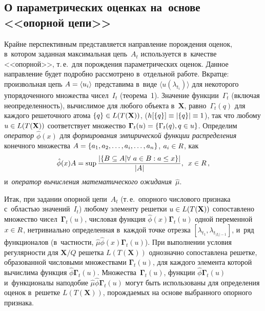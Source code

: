 \begin{multicols}{2}
\section{О параметрических оценках на~основе <<опорной цепи>>}

     Крайне перспективным пред\-став\-ля\-ет\-ся на\-прав\-ле\-ние по\-рож\-де\-ния 
оценок, в~котором заданная максимальная цепь~$A_t$ используется 
в~качестве <<опор\-ной>>, т.\,е.\ для по\-рож\-де\-ния па\-ра\-мет\-ри\-че\-ских \mbox{оценок}. 
Данное на\-прав\-ле\-ние будет по\-дроб\-но рас\-смот\-ре\-но в~отдельной работе. 
Вкратце: произвольная цепь $A\hm= \langle u_i\rangle$ пред\-ста\-ви\-ма в~виде 
$\langle u(\lambda_{t_i})\rangle$ для некоторого упорядоченного множества 
чисел~$I_t$ (тео\-ре\-ма~1). Значение функции~$\Gamma_t$ (включая 
не\-опре\-де\-лен\-ность), вы\-чис\-ли\-мое для любого объекта в~$\mathbf{X}$, 
рав\-но~$\Gamma_t(q)$ для каж\-до\-го решеточного атома $\{q\}\hm\in 
L(T(\mathbf{X}))$, ($h[\{q\}] \hm\equiv \vert \{q\}\vert \hm\equiv 1$), так что 
любому $u\hm\in L(T(\mathbf{X}))$ соответствует множество 
$\bm{\Gamma}_t (u)\hm= \{ \Gamma_t(q), q\hm\in u\}$. Определим 
\textit{оператор} $\hat{\phi}(x)$ для \textit{формирования эмпирической 
функции распределения}  конечного множества $A\hm= \{a_1, a_2, \ldots , a_i, 
\ldots , a_n\}$, $a_i\hm\in R$, как 
$$
\hat{\phi}(x) A=\mathrm{sup}\,\fr{\vert \{ 
B\hm\subseteq A\vert \forall\ a\in B: a\hm\leq x\}\vert }{\vert A\vert},\enskip x\in R\,,
$$
 и~\textit{оператор вы\-чис\-ле\-ния математического ожидания}~$\hat{\mu}$. 
     
     Итак, при задании опорной цепи~$A_t$ (т.\,е.\ опорного чис\-ло\-во\-го 
при\-зна\-ка с~об\-ластью значений~$I_t$) любому элементу решетки $u\hm\in 
L(T(\mathbf{X}))$ со\-по\-став\-ле\-но множество чисел~$\bm{\Gamma}_t(u)$, 
числовая функция $\hat{\phi}(x)\bm{\Gamma}_t(u)$ одной переменной 
$x\hm\in R$, не\-три\-ви\-аль\-но определенная в~каж\-дой точке отрезка 
$[\lambda_{t_1}, \lambda_{t_{\vert I_t\vert-1}}]$, и~ряд функционалов 
(в~част\-ности, $\hat{\mu}\hat{\phi}(x)\bm{\Gamma}_t(u)$). При выполнении 
условия ре\-гу\-ляр\-ности для $\mathbf{X}/Q$ решетка $L(T(\mathbf{X}))$ 
однозначно со\-по\-став\-ле\-на решетке, образованной чис\-ло\-вы\-ми множествами 
$\bm{\Gamma}_t(u)$, для каж\-до\-го элемента которой вы\-чис\-ли\-ма функция 
$\hat{\phi}\bm{\Gamma}_t(u)$. Множества~$\bm{\Gamma}_t(u)$, функции 
$\hat{\phi}\bm{\Gamma}_t(u)$ и~функционалы наподобие 
$\hat{\mu}\hat{\phi}\bm{\Gamma}_t(u)$ могут быть использованы для 
определения оценок в~решетке $L(T(\mathbf{X}))$, по\-рож\-да\-емых на осно\-ве 
выбранного опорного при\-знака. 


\end{multicols}
